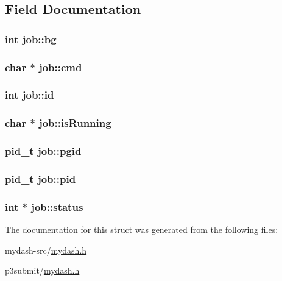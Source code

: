 \subsection{Field Documentation}
\hypertarget{structjob_a0bcf91a5eab3e72e05013ba164ed9f71}{
\subsubsection[{bg}]{\setlength{\rightskip}{0pt plus 5cm}int job\-::bg}}\label{structjob_a0bcf91a5eab3e72e05013ba164ed9f71}
\hypertarget{structjob_aae40709790f87074b0d1b55b8b0c1abe}{
\subsubsection[{cmd}]{\setlength{\rightskip}{0pt plus 5cm}char $\ast$ job\-::cmd}}\label{structjob_aae40709790f87074b0d1b55b8b0c1abe}
\hypertarget{structjob_a14f2a8b63b37554fd774fefa8e75608e}{
\subsubsection[{id}]{\setlength{\rightskip}{0pt plus 5cm}int job\-::id}}\label{structjob_a14f2a8b63b37554fd774fefa8e75608e}
\hypertarget{structjob_a3831d603820f85bc242b8f2a6de5dab2}{
\subsubsection[{is\-Running}]{\setlength{\rightskip}{0pt plus 5cm}char $\ast$ job\-::is\-Running}}\label{structjob_a3831d603820f85bc242b8f2a6de5dab2}
\hypertarget{structjob_a16974ac47f6847a999db852190596573}{
\subsubsection[{pgid}]{\setlength{\rightskip}{0pt plus 5cm}pid\-\_\-t job\-::pgid}}\label{structjob_a16974ac47f6847a999db852190596573}
\hypertarget{structjob_ac933714dad42e15065544f503cbba8d5}{
\subsubsection[{pid}]{\setlength{\rightskip}{0pt plus 5cm}pid\-\_\-t job\-::pid}}\label{structjob_ac933714dad42e15065544f503cbba8d5}
\hypertarget{structjob_a6a8ce162e046e774fdbf319d96cfbf37}{
\subsubsection[{status}]{\setlength{\rightskip}{0pt plus 5cm}int $\ast$ job\-::status}}\label{structjob_a6a8ce162e046e774fdbf319d96cfbf37}


The documentation for this struct was generated from the following files\-:\begin{DoxyCompactItemize}
\item 
mydash-\/src/\hyperlink{mydash-src_2mydash_8h}{mydash.\-h}\item 
p3submit/\hyperlink{p3submit_2mydash_8h}{mydash.\-h}\end{DoxyCompactItemize}
